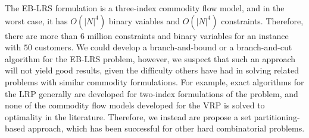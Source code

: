 
The EB-LRS formulation is a three-index commodity flow model, and in the worst case, 
it has $O(|N|^4)$ binary vaiables and $O(|N|^4)$ constraints. Therefore,
there are more than 6 million constraints and binary variables for an 
instance with $50$ customers. We could develop a branch-and-bound or
a branch-and-cut algorithm for the EB-LRS problem, however, we suspect
that such an approach will not yield good results, given the difficulty 
others have had in solving related problems with similar commodity formulations. 
For example, exact algorithms for the LRP generally are developed 
for two-index formulations of the problem, and none of the commodity 
flow models developed for the VRP is solved to optimality in the
literature. Therefore, we instead are propose a set 
partitioning-based approach, which has been successful for other hard 
combinatorial problems. 
 


